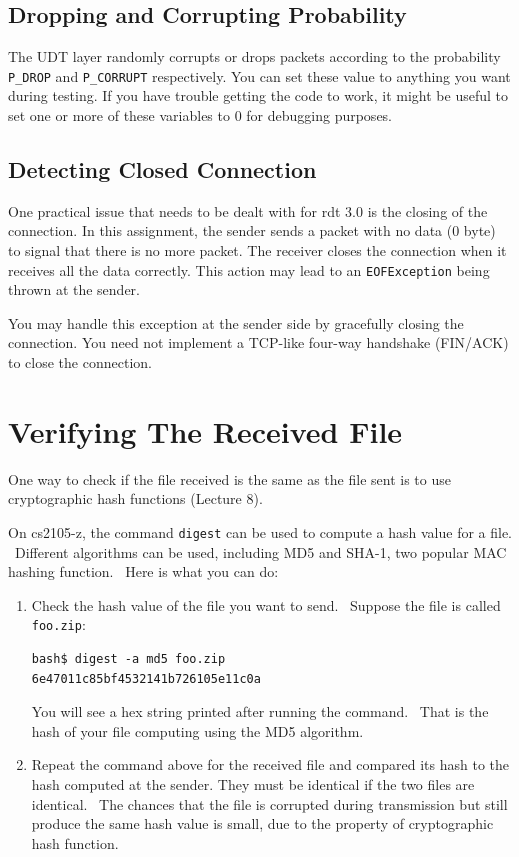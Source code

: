 \documentclass[a4paper,11pt]{exam}
\begin{document}
\subsection*{Dropping and Corrupting Probability}

The UDT layer randomly corrupts or drops packets according to the probability \texttt{P\_DROP} and \texttt{P\_CORRUPT} respectively.  You can set these value to anything you want during testing.  If you have trouble getting the code to work, it might be useful to set one or more of these variables to 0 for debugging purposes.

\subsection*{Detecting Closed Connection}
One practical issue that needs to be dealt with for rdt 3.0 is the closing of the connection.  In this assignment, the sender sends a packet with no data (0 byte) to signal that there is no more packet.  The receiver closes the connection when it receives all the data correctly.  This action may lead to an \texttt{EOFException} being thrown at the sender.

You may handle this exception at the sender side by gracefully closing the connection.  You need not implement a TCP-like four-way handshake (FIN/ACK) to close the connection.

\section*{Verifying The Received File}
One way to check if the file received is the same as the file sent is to use cryptographic hash functions (Lecture 8).

On cs2105-z, the command \texttt{digest} can be used to compute a hash value for a file.  Different algorithms can be used, including MD5 and SHA-1, two popular MAC hashing function.  Here is what you can do:
\begin{enumerate}
\item Check the hash value of the file you want to send.  Suppose the file is called \texttt{foo.zip}:
\begin{verbatim}
bash$ digest -a md5 foo.zip
6e47011c85bf4532141b726105e11c0a
\end{verbatim}
You will see a hex string printed after running the command.  That is the hash of your file computing using the MD5 algorithm.

\item Repeat the command above for the received file and compared its hash to the hash computed at the sender.  They must be identical if the two files are identical.  The chances that the file is corrupted during transmission but still produce the same hash value is small, due to the property of cryptographic hash function.
\end{enumerate}
\end{document}
